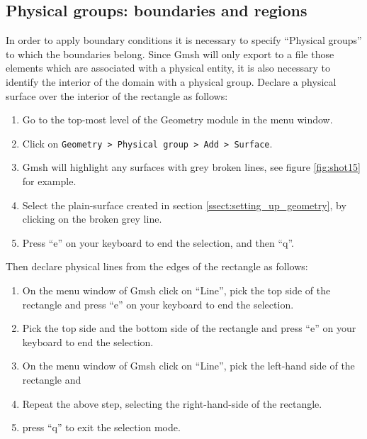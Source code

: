\subsection{Physical groups: boundaries and regions}
\label{ssect:2d_physical_groups}
\par
In order to apply boundary conditions it is necessary to specify ``Physical groups'' to which the boundaries belong. Since Gmsh will only export to a file those elements which are associated with a physical entity, it is also necessary to identify the interior of the domain with a physical group. Declare a physical surface over the interior of the rectangle as follows:
\begin{enumerate}
  \item Go to the top-most level of the Geometry module in the menu window.
  \item Click on \lstinline{Geometry > Physical group > Add > Surface}.
  \item Gmsh will highlight any surfaces with grey broken lines, see figure \ref{fig:shot15}
        for example.
  \item Select the plain-surface created in section \ref{ssect:setting_up_geometry}, by clicking on the
        broken grey line.
  \item Press ``e'' on your keyboard to end the selection, and then ``q''.
\end{enumerate}
Then declare physical lines from the edges of the rectangle as follows:
\begin{enumerate}
  \item On the menu window of Gmsh click on ``Line'', pick the top side of the rectangle and
        press ``e'' on your keyboard to end the selection.
  \item Pick the top side and the bottom side of the rectangle and press ``e'' on your keyboard to
        end the selection.
  \item On the menu window of Gmsh click on ``Line'', pick the left-hand side of the rectangle and
  \item Repeat the above step, selecting the right-hand-side of the rectangle.
  \item press ``q'' to exit the selection mode.
\end{enumerate}

